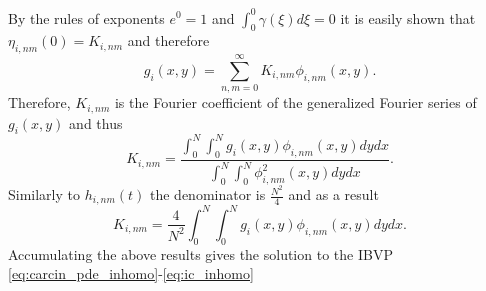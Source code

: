 \documentclass[\main/thesis.tex]{subfiles}
\begin{document}
By the rules of exponents $e^0 {=} 1$ and $\int_{0}^{0} \gamma(\xi) d\xi {=} 0$ 
it is easily shown that \newline
$\eta_{i,nm}(0) {=} K_{i,nm}$ and therefore
\begin{equation*}
	g_{i}(x, y) {=} \sum_{n,m {=} 0}^{\infty} K_{i,nm} \phi_{i,nm}(x, y).
\end{equation*}
Therefore, $K_{i,nm}$ is the Fourier coefficient of the generalized Fourier 
series of $g_i(x, y)$ and thus
\begin{equation*}
	K_{i,nm} {=} \frac{\int_{0}^{N} \int_{0}^{N} g_i(x, y) \phi_{i,nm}(x, y) dydx}
	                  {\int_{0}^{N} \int_{0}^{N} \phi_{i,nm}^2(x, y) dydx}.
\end{equation*}
Similarly to $h_{i,nm}(t)$ the denominator is $\frac{N^2}{4}$ and as a result
\begin{equation}
	K_{i,nm} {=} \frac{4}
	                  {N^2}
	             \int_{0}^{N}\int_{0}^{N} g_i(x, y) \phi_{i,nm}(x, y) dydx.
	\label{eq:fourier_coeff_g}
\end{equation}
Accumulating the above results gives the solution to the IBVP 
\eqref{eq:carcin_pde_inhomo}-\eqref{eq:ic_inhomo}  
\end{document}
